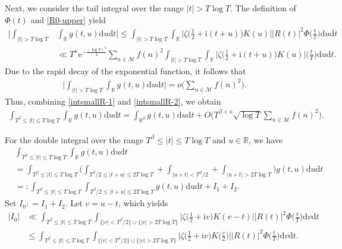 \documentclass[12pt,reqno]{amsart}
\theoremstyle{definition}
\numberwithin{equation}{section}
\newcommand{\bgg}{\bigg}
\newcommand{\Bg}{\Big}
\newcommand{\Bgl}{\Big(}
\newcommand{\Bgr}{\Big)}
\newcommand{\ph}{\Phi}
\newcommand{\mbr}{\mathbb{R}}
\newcommand{\mcm}{\mathcal{M}}
\newcommand{\mmd}{\mathrm{d}}
\newcommand{\mme}{\mathrm{e}}
\newcommand{\mmi}{\mathrm{i}}
\begin{document}
\par
Next, we consider the tail integral over the range \(|t| > T\log T\). The definition of \(\Phi(t)\) and \eqref{R0-upper} yield
\begin{align*}
    \bgg|\int_{|t|> T \log T}&  \int_\mbr g(t,u) \mmd u \mmd t \bgg|  
    \le \int_{|t| > T \log T} \int_\mbr \Bg|\zeta\Bgl \frac{1}{2}
    + \mmi (t+u) \Bgr K(u)\Bg| |R(t)|^2 \ph \Bgl\frac{t}{T}\Bgr \mmd u \mmd t \\
    & \ll T^\kappa \mme^{-\frac{(\log T)^2}{4}} \sum_{n \in \mcm}f(n)^2  \int_{|t|>T \log T} \int_\mbr \Bg|\zeta\Bgl \frac{1}{2}+ \mmi (t+u) \Bgr K(u)\Bg| \Bgl\frac{t}{T}\Bgr \mmd u \mmd t.
\end{align*}
Due to the rapid decay of the exponential function, it follows that
\begin{align}
        \label{intsmallR-2}
      \bgg|\int_{|t| > T\log T} \int_\mbr g(t,u) \mmd u \mmd t \bgg| = o \Bgl\sum_{n \in \mcm}f(n)^2 \Bgr.
\end{align}
Thus, combining \eqref{intsmallR-1} and \eqref{intsmallR-2}, we obtain
\begin{align}
\label{intR-asy}
    \int_{T^\beta \le |t| \le T\log T} \int_\mbr g(t,u)\mmd u \mmd t 
    = \int_{\mbr^2} g(t,u)\mmd u \mmd t + O\Bgl T^{\beta+\kappa}\sqrt{\log T}\sum_{n \in \mcm}f(n)^2 \Bgr.
\end{align}
\par
For the double integral over the range \(T^\beta \le |t| \le T\log T\) and \(u \in \mbr\),  we have
\begin{align}
\label{intbigR-1}
& \int_{T^\beta \le |t| \le T\log T} \int_\mbr g(t,u)\mmd u \mmd t \nonumber \\
&= \int_{T^\beta \le |t| \le T\log T}  \Bgl \int_{T^\beta/2 \le |t+u| \le 2T\log T}+\int_{|u+t| < T^\beta/2}+\int_{|u+t| > 2T\log T} \Bgr  g(t,u) \mmd u \mmd t \nonumber \\
&= : \int_{T^\beta \le |t| \le T\log T}  \int_{T^\beta/2 \le |t+u| \le 2T\log T}g(t,u) \mmd u \mmd t+I_1+I_2.
\end{align}
Set \(I_0 : =I_1+I_2\). Let \(v=u-t\), which yields
\begin{align*}
    |I_0| & \ll \int_{T^\beta \le |t| \le T\log T} \int_{\{|v| < T^\beta /2\}\cup\{|v| > 2T\log T\}}\Bg|\zeta\Bgl \frac{1}{2}
    + \mmi v \Bgr K(v-t)\Bg| |R(t)|^2 \ph \Bgl\frac{t}{T}\Bgr \mmd v \mmd t \\
    & \le \int_{T^\beta \le |t| \le T\log T} \int_{\{|v| < T^\beta /2\}\cup\{|v| > 2T\log T\}}\Bg|\zeta\Bgl \frac{1}{2}
    + \mmi v \Bgr K\Bg(\frac{v}{2}\Bg)\Bg| |R(t)|^2 \ph \Bgl\frac{t}{T}\Bgr \mmd v \mmd t. 
\end{align*}
\end{document}
